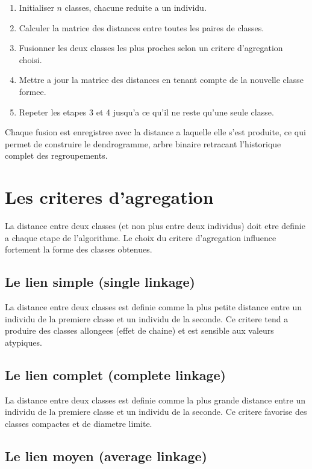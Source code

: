 \documentclass[12pt,a4paper]{book}
\begin{document}
	\begin{enumerate}
		\item Initialiser $n$ classes, chacune reduite a un individu.
		\item Calculer la matrice des distances entre toutes les paires de classes.
		\item Fusionner les deux classes les plus proches selon un critere d'agregation choisi.
		\item Mettre a jour la matrice des distances en tenant compte de la nouvelle classe formee.
		\item Repeter les etapes 3 et 4 jusqu'a ce qu'il ne reste qu'une seule classe.
	\end{enumerate}
	
	Chaque fusion est enregistree avec la distance a laquelle elle s'est produite, ce qui permet de construire le dendrogramme, arbre binaire retracant l'historique complet des regroupements.
	
	\section{Les criteres d'agregation}
	
	La distance entre deux classes (et non plus entre deux individus) doit etre definie a chaque etape de l'algorithme. Le choix du critere d'agregation influence fortement la forme des classes obtenues.
	
	\subsection{Le lien simple (single linkage)}
	
	La distance entre deux classes est definie comme la plus petite distance entre un individu de la premiere classe et un individu de la seconde. Ce critere tend a produire des classes allongees (effet de chaine) et est sensible aux valeurs atypiques.
	
	\subsection{Le lien complet (complete linkage)}
	
	La distance entre deux classes est definie comme la plus grande distance entre un individu de la premiere classe et un individu de la seconde. Ce critere favorise des classes compactes et de diametre limite.
	
	\subsection{Le lien moyen (average linkage)}
	
\end{document}
